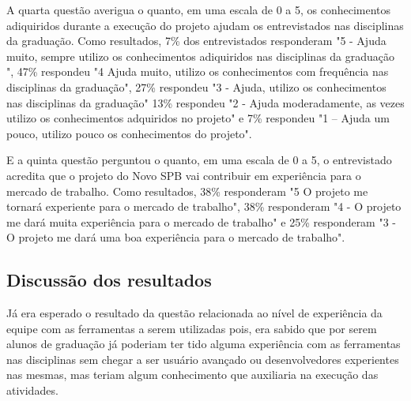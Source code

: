 A quarta questão averigua o quanto, em uma escala de 0 a 5, os conhecimentos adiquiridos durante a execução do projeto ajudam os entrevistados nas disciplinas da graduação. Como resultados, 7\% dos entrevistados responderam "5 - Ajuda muito, sempre utilizo os conhecimentos adiquiridos nas disciplinas da graduação	", 47\% respondeu "4  Ajuda muito, utilizo os conhecimentos com frequência nas disciplinas da graduação", 27\% respondeu "3 - Ajuda, utilizo os conhecimentos nas disciplinas da graduação" 13\% respondeu "2 - Ajuda moderadamente, as vezes utilizo os conhecimentos adquiridos no projeto" e 7\% respondeu "1 – Ajuda um pouco, utilizo pouco os conhecimentos do projeto".


E a quinta questão perguntou o quanto, em uma escala de 0 a 5, o entrevistado acredita que o projeto do Novo SPB vai contribuir em experiência para o mercado de trabalho. Como resultados, 38\% responderam "5  O projeto me tornará experiente para o mercado de trabalho", 38\% responderam "4 - O projeto me dará muita experiência para o mercado de trabalho" e 25\% responderam "3 - O projeto me dará uma boa experiência para o mercado de trabalho".


\subsection{Discussão dos resultados}

Já era esperado o resultado da questão relacionada ao nível de experiência da equipe com as ferramentas a serem utilizadas pois, era sabido que por serem alunos de graduação já poderiam ter tido alguma experiência com as ferramentas nas disciplinas sem chegar a ser usuário avançado ou desenvolvedores experientes nas mesmas, mas teriam algum conhecimento que auxiliaria na execução das atividades.

